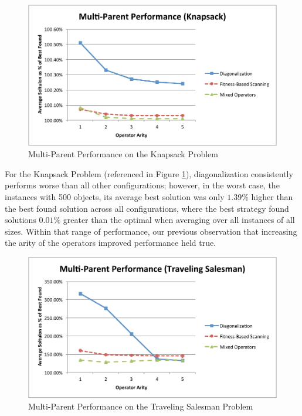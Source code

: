 \begin{figure}[htbp!]
\centering
\includegraphics[scale=0.70]{charts/MP_Knapsack.pdf}
\caption{Multi-Parent Performance on the Knapsack Problem}
\label{fig:mp_knapsack}
\end{figure}

For the Knapsack Problem (referenced in Figure \ref{fig:mp_knapsack}), diagonalization consistently performs worse than all other configurations; however, in the worst case, the instances with 500 objects, its average best solution was only $1.39\%$ higher than the best found solution across all configurations, where the best strategy found solutions $0.01\%$ greater than the optimal when averaging over all instances of all sizes. Within that range of performance, our previous observation that increasing the arity of the operators improved performance held true.

\begin{figure}[htbp!]
\centering
\includegraphics[scale=0.70]{charts/MP_TSP.pdf}
\caption{Multi-Parent Performance on the Traveling Salesman Problem}
\label{fig:mp_tsp}
\end{figure}

